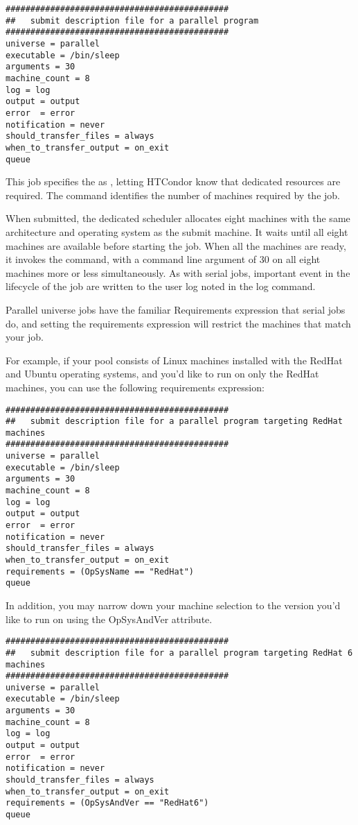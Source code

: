 \begin{verbatim}
#############################################
##   submit description file for a parallel program
#############################################
universe = parallel
executable = /bin/sleep
arguments = 30
machine_count = 8
log = log
output = output
error  = error
notification = never
should_transfer_files = always
when_to_transfer_output = on_exit
queue 
\end{verbatim}

This job specifies the  as , letting
HTCondor know that dedicated resources are required.  The
 command identifies the number of machines
required by the job. 

When submitted, the dedicated scheduler allocates eight
machines with the same architecture and operating system as the submit
machine.  It waits until all eight machines are available before
starting the job.  When all the machines are ready, it invokes the
 command, with a command line argument of 30
on all eight machines more or less simultaneously.  As with serial
jobs, important event in the lifecycle of the job are written
to the user log noted in the log command.

Parallel universe jobs have the familiar Requirements expression
that serial jobs do, and setting the requirements expression will
restrict the machines that match your job.

For example, if your pool consists of Linux machines installed with the RedHat and Ubuntu operating systems, and you'd like to run on only the RedHat machines, you can use
the following requirements expression:

\begin{verbatim}
#############################################
##   submit description file for a parallel program targeting RedHat machines
#############################################
universe = parallel
executable = /bin/sleep
arguments = 30
machine_count = 8
log = log
output = output
error  = error
notification = never
should_transfer_files = always
when_to_transfer_output = on_exit
requirements = (OpSysName == "RedHat")
queue 

\end{verbatim}

In addition, you may narrow down your machine selection to the version you'd like to run on using the OpSysAndVer attribute.

\begin{verbatim}
#############################################
##   submit description file for a parallel program targeting RedHat 6 machines
#############################################
universe = parallel
executable = /bin/sleep
arguments = 30
machine_count = 8
log = log
output = output
error  = error
notification = never
should_transfer_files = always
when_to_transfer_output = on_exit
requirements = (OpSysAndVer == "RedHat6")
queue
\end{verbatim}

